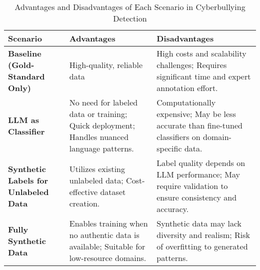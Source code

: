 \begin{table*}[ht]
\centering
\caption{Advantages and Disadvantages of Each Scenario in Cyberbullying Detection}
\label{t:scenario-advantages-disadvantages}
\begin{tabularx}{\linewidth}{|X|X|X|}%
\hline
\textbf{Scenario} & \textbf{Advantages} & \textbf{Disadvantages} \\ \hline

\textbf{Baseline (Gold-Standard Only)} & 
High-quality, reliable data &
High costs and scalability challenges; Requires significant time and expert annotation effort. \\ \hline

\textbf{LLM as Classifier} & 
No need for labeled data or training; Quick deployment; Handles nuanced language patterns. & 
Computationally expensive; May be less accurate than fine-tuned classifiers on domain-specific data. \\ \hline

\textbf{Synthetic Labels for Unlabeled Data} & Utilizes existing unlabeled data; Cost-effective dataset creation. & Label quality depends on LLM performance; May require validation to ensure consistency and accuracy. \\ \hline

\textbf{Fully Synthetic Data} & 
Enables training when no authentic data is available; Suitable for low-resource domains. & 
Synthetic data may lack diversity and realism; Risk of overfitting to generated patterns. \\ \hline



\end{tabularx}
\end{table*}


